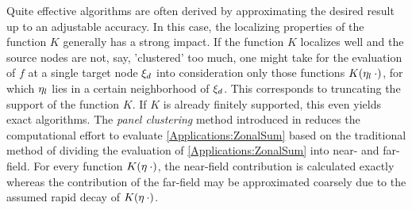 Quite effective algorithms are often derived by approximating the desired result 
up to an adjustable accuracy. In this case, the localizing properties of the function $K$ 
generally has a strong impact. If the function $K$ localizes well and the source nodes 
are not, say, 'clustered' too much, one might take for the evaluation of $f$ at a single target 
node $\mathbf{\xi}_{d}$ into consideration only those functions $K{\hspace{-0.4ex}}\left(\mathbf{\eta}_{l}\:\cdot\right)$, for
which $\mathbf{\eta}_{l}$ lies in a certain neighborhood of $\mathbf{\xi}_{d}$. This corresponds to 
truncating the support of the function $K$. If $K$ is already finitely supported, this even
yields exact algorithms. 
The \emph{panel clustering} method introduced in \cite{FrGlSch98} reduces the computational 
effort to evaluate \eqref{Applications:ZonalSum} based on the traditional method of dividing 
the evaluation of \eqref{Applications:ZonalSum} into near- and far-field. For every function
$K{\hspace{-0.4ex}}\left(\mathbf{\eta} \: \cdot\right)$, the near-field contribution is calculated exactly whereas the 
contribution of the far-field may be approximated coarsely due to the assumed rapid decay 
of $K{\hspace{-0.4ex}}\left(\mathbf{\eta} \: \cdot\right)$. 

